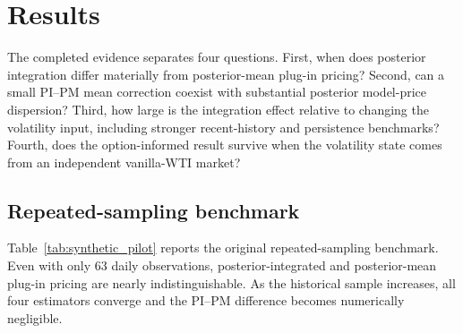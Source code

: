 \section{Results}\label{sec:results}

The completed evidence separates four questions. First, when does posterior integration differ materially from posterior-mean plug-in pricing? Second, can a small PI--PM mean correction coexist with substantial posterior model-price dispersion? Third, how large is the integration effect relative to changing the volatility input, including stronger recent-history and persistence benchmarks? Fourth, does the option-informed result survive when the volatility state comes from an independent vanilla-WTI market?

\subsection{Repeated-sampling benchmark}

Table~\ref{tab:synthetic_pilot} reports the original repeated-sampling benchmark. Even with only 63 daily observations, posterior-integrated and posterior-mean plug-in pricing are nearly indistinguishable. As the historical sample increases, all four estimators converge and the PI--PM difference becomes numerically negligible.

